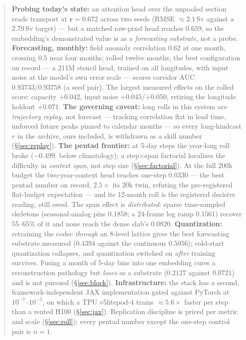 \documentclass[10pt]{article}
\begin{document}
\begin{abstract}
\textbf{Probing today's state:} an attention head over the unpooled
section reads transport at $\mathbf{r=0.672}$ across two seeds
(RMSE ${\approx}2.1$\,Sv against a 2.79\,Sv target) --- but a matched
raw-pixel head reaches $0.659$, so the embedding's demonstrated value is
as a \emph{forecasting substrate}, not a probe.
\textbf{Forecasting, monthly:} field anomaly correlation $0.62$ at one
month, crossing $0.5$ near four months; rolled twelve months, the best
configuration on record --- a 211M stencil head, trained on all
longitudes, with input noise at the model's own error scale --- scores
corridor AUC $\mathbf{0.93733/0.93758}$ (a seed pair). The largest
measured effects on the rolled score: capacity $+0.042$, input noise
$+0.045$/$+0.050$, retiring the longitude holdout $+0.071$.
\textbf{The governing caveat:} long rolls in this system are
\emph{trajectory replay}, not forecast --- tracking correlation flat in
lead time, unforced future peaks pinned to calendar months --- so every
long-hindcast $r$ in the archive, ours included, is withdrawn as a skill
number (\S\ref{sec:replay}).
\textbf{The pentad frontier:} at 5-day steps the year-long roll broke
($-0.499$, below climatology); a step$\times$span factorial localizes
the difficulty in \emph{context span}, not step size
(\S\ref{sec:factorial}). At the full 200k budget the two-year-context
head reaches one-step $\mathbf{0.0330}$ --- the best pentad number on
record, $2.5\times$ its 20k twin, refuting the pre-registered flat-budget
expectation --- and its 12-month roll is the registered decisive reading,
still owed. The span effect is \emph{distributed}: sparse time-sampled
skeletons (seasonal-analog pins $0.1858$; a 24-frame log ramp $0.1561$)
recover 55--65\% of it and none reach the dense slab's $0.0820$.
\textbf{Quantization:} retraining the codec \emph{through} an 8-level
lattice gives the best forecasting substrate measured
($\mathbf{0.4394}$ against the continuous $0.5056$); cold-start
quantization collapses, and quantization switched on \emph{after}
training survives. Fusing a month of 5-day bins into one embedding cures
a reconstruction pathology but \emph{loses} as a substrate ($0.2127$
against $0.0721$) and is not pursued (\S\ref{sec:block}).
\textbf{Infrastructure:} the stack has a second, framework-independent
JAX implementation gated against PyTorch at $10^{-7}$--$10^{-5}$, on
which a TPU v5litepod-4 trains ${\approx}5.6\times$ faster per step than
a rented H100 (\S\ref{sec:jax}). Replication discipline is priced per
metric and scale (\S\ref{sec:roll}); every pentad number except the
one-step control pair is $n{=}1$.
\end{abstract}
\end{document}
